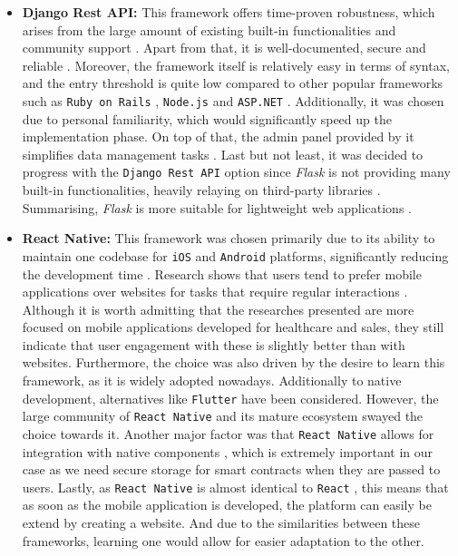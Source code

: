 \begin{itemize}
    \item \textbf{Django Rest API:} This framework offers time-proven robustness, which arises from the large amount of existing built-in functionalities and community support \cite{HillarEtAl2018}. Apart from that, it is well-documented, secure and reliable \cite{Ghimire2020, HillarEtAl2018}. Moreover, the framework itself is relatively easy in terms of syntax, and the entry threshold is quite low compared to other popular frameworks \cite{HillarEtAl2018, EliseevaEtAl2020, Plekhanova2009, Mao2018} such as \texttt{Ruby on Rails} \cite{LaurentEtAl2008}, \texttt{Node.js} \cite{Mead2018} and \texttt{ASP.NET} \cite{Ragupathi2016}. Additionally, it was chosen due to personal familiarity, which would significantly speed up the implementation phase. On top of that, the admin panel provided by it simplifies data management tasks \cite{HillarEtAl2018}. Last but not least, it was decided to progress with the \texttt{Django Rest API} option since \textit{Flask} is not providing many built-in functionalities, heavily relaying on third-party libraries \cite{ChanEtAl2019}. Summarising, \textit{Flask} is more suitable for lightweight web applications \cite{ChanEtAl2019}. 
    \item \textbf{React Native:} This framework was chosen primarily due to its ability to maintain one codebase for \texttt{iOS} and \texttt{Android} platforms, significantly reducing the development time \cite{MasielloEtAl2017}. Research shows that users tend to prefer mobile applications over websites for tasks that require regular interactions \cite{TurnerMcGrievyEtAl2016, TupikovskajaOmovieEtAl2015, AlmarashdehEtAL2019, Warcholinski2024}. Although it is worth admitting that the researches presented are more focused on mobile applications developed for healthcare and sales, they still indicate that user engagement with these is slightly better than with websites. Furthermore, the choice was also driven by the desire to learn this framework, as it is widely adopted nowadays. Additionally to native development, alternatives like \texttt{Flutter} have been considered. However, the large community of \texttt{React Native} and its mature ecosystem \cite{Wu2018, Boduch2017} swayed the choice towards it. Another major factor was that \texttt{React Native} allows for integration with native components \cite{Boduch2017}, which is extremely important in our case as we need secure storage for smart contracts when they are passed to users. Lastly, as \texttt{React Native} is almost identical to \texttt{React} \cite{Boduch2017}, this means that as soon as the mobile application is developed, the platform can easily be extend by creating a website. And due to the similarities between these frameworks, learning one would allow for easier adaptation to the other.
\end{itemize}

